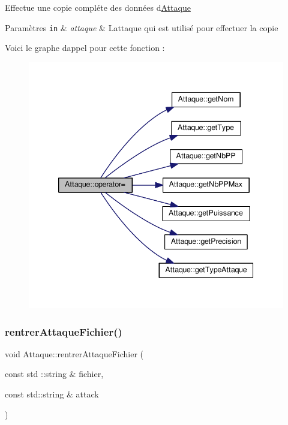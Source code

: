 Effectue une copie compléte des données d\textquotesingle{}\hyperlink{class_attaque}{Attaque} 
\begin{DoxyParams}[1]{Paramètres}
\mbox{\tt in}  & {\em attaque} & L\textquotesingle{}attaque qui est utilisé pour effectuer la copie \\
\hline
\end{DoxyParams}
Voici le graphe d\textquotesingle{}appel pour cette fonction \+:\nopagebreak
\begin{figure}[H]
\begin{center}
\leavevmode
\includegraphics[width=339pt]{class_attaque_a21b14fe41db692f8e38aa1821a3519b9_cgraph}
\end{center}
\end{figure}
\mbox{\label{class_attaque_ac6a1ff465a27d926b72807354e6587eb}} 
\subsubsection{\texorpdfstring{rentrer\+Attaque\+Fichier()}{rentrerAttaqueFichier()}}
{\footnotesize\ttfamily void Attaque\+::rentrer\+Attaque\+Fichier (\begin{DoxyParamCaption}\item[{const std \+::string \&}]{fichier,  }\item[{const std\+::string \&}]{attack }\end{DoxyParamCaption})}



